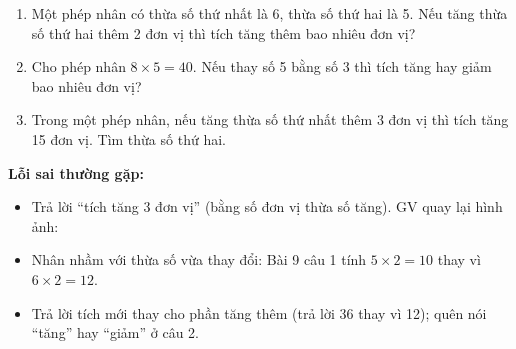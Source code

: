 \documentclass[../main.tex]{subfiles}
\begin{document}
\begin{enumerate}
    \item Một phép nhân có thừa số thứ nhất là 6, thừa số thứ hai là 5. Nếu tăng thừa số thứ hai thêm 2 đơn vị thì tích tăng thêm bao nhiêu đơn vị? 
    \item Cho phép nhân $8 \times 5 = 40$. Nếu thay số 5 bằng số 3 thì tích tăng hay giảm bao nhiêu đơn vị? 
    \item Trong một phép nhân, nếu tăng thừa số thứ nhất thêm 3 đơn vị thì tích tăng 15 đơn vị. Tìm thừa số thứ hai. 
\end{enumerate}
\begin{luuy}
    \textbf{Lỗi sai thường gặp:}
    \begin{itemize}
        \item Trả lời “tích tăng 3 đơn vị” (bằng số đơn vị thừa số tăng). GV quay lại hình ảnh: 
        \item Nhân nhầm với thừa số vừa thay đổi: Bài 9 câu 1 tính $5 \times 2 = 10$ thay vì $6 \times 2 = 12$.
        \item Trả lời tích mới thay cho phần tăng thêm (trả lời 36 thay vì 12); quên nói “tăng” hay “giảm” ở câu 2.
    \end{itemize}
\end{luuy}

\end{document}
